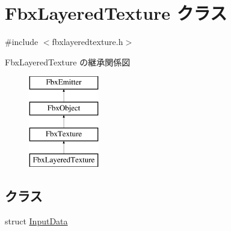 \hypertarget{class_fbx_layered_texture}{}\section{Fbx\+Layered\+Texture クラス}
\label{class_fbx_layered_texture}


{\ttfamily \#include $<$fbxlayeredtexture.\+h$>$}

Fbx\+Layered\+Texture の継承関係図\begin{figure}[H]
\begin{center}
\leavevmode
\includegraphics[height=4.000000cm]{class_fbx_layered_texture}
\end{center}
\end{figure}
\subsection*{クラス}
\begin{DoxyCompactItemize}
\item 
struct \hyperlink{struct_fbx_layered_texture_1_1_input_data}{Input\+Data}
\end{DoxyCompactItemize}
